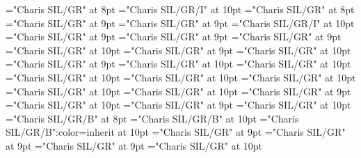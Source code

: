 \documentclass[gps1,twoside]{article}
\begin{document}
\font\exampleexampleexamplessensesensecontentsensesentryletData="Charis SIL/GR" at 8pt
\font\spanbzhexampleexampleexamplessensesensecontentsensesentryletData="Charis SIL/GR/I" at 10pt
\font\translationsexampleexamplessensesensecontentsensesentryletData="Charis SIL/GR" at 8pt
\font\translationtranslationsexampleexamplessensesensecontentsensesentryletData="Charis SIL/GR" at 9pt
\font\translationtranslationtranslationsexampleexamplessensesensecontentsensesentryletData="Charis SIL/GR" at 9pt
\font\spanentranslationtranslationtranslationsexampleexamplessensesensecontentsensesentryletData="Charis SIL/GR/I" at 10pt
\font\semanticdomainssensesensecontentsensesentryletData="Charis SIL/GR" at 9pt
\font\semanticdomainsemanticdomainssensesensecontentsensesentryletData="Charis SIL/GR" at 9pt
\font\abbreviationsemanticdomainsemanticdomainssensesensecontentsensesentryletData="Charis SIL/GR" at 9pt
\font\spanenabbreviationsemanticdomainsemanticdomainssensesensecontentsensesentryletData="Charis SIL/GR" at 10pt
\font\namesemanticdomainsemanticdomainssensesensecontentsensesentryletData="Charis SIL/GR" at 9pt
\font\spanennamesemanticdomainsemanticdomainssensesensecontentsensesentryletData="Charis SIL/GR" at 10pt
\font\picturesentryletData="Charis SIL/GR" at 9pt
\font\picturepicturesentryletData="Charis SIL/GR" at 10pt
\font\thumbnailpicturepicturesentryletData="Charis SIL/GR" at 10pt
\font\sensenumberpicturepicturesentryletData="Charis SIL/GR" at 10pt
\font\spanensensenumberpicturepicturesentryletData="Charis SIL/GR" at 10pt
\font\captionpicturepicturesentryletData="Charis SIL/GR" at 10pt
\font\captioncaptionpicturepicturesentryletData="Charis SIL/GR" at 10pt
\font\spanencaptioncaptionpicturepicturesentryletData="Charis SIL/GR" at 10pt
\font\scientificnamesensesensecontentsensesentryletData="Charis SIL/GR" at 9pt
\font\spanenscientificnamesensesensecontentsensesentryletData="Charis SIL/GR" at 10pt
\font\subentriesentryletData="Charis SIL/GR" at 9pt
\font\subentrysubentriesentryletData="Charis SIL/GR" at 10pt
\font\headwordsubentrysubentriesentryletData="Charis SIL/GR/B" at 8pt
\font\spanbzhheadwordsubentrysubentriesentryletData="Charis SIL/GR/B" at 10pt
\font\aspanbzhheadwordsubentrysubentriesentryletData="Charis SIL/GR/B":color=inherit at 10pt
\font\complexformtypessubentrysubentriesentryletData="Charis SIL/GR" at 9pt
\font\complexformtypecomplexformtypessubentrysubentriesentryletData="Charis SIL/GR" at 9pt
\font\reverseabbrcomplexformtypecomplexformtypessubentrysubentriesentryletData="Charis SIL/GR" at 9pt
\font\spanenreverseabbrcomplexformtypecomplexformtypessubentrysubentriesentryletData="Charis SIL/GR" at 10pt
\end{document}
